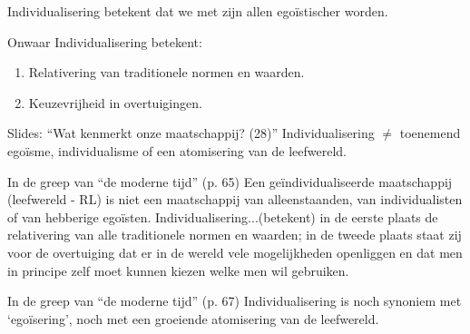 \documentclass[main.tex]{subfiles}
\begin{document}
\begin{examenvraag}
    \begin{stelling}
        Individualisering betekent dat we met zijn allen egoïstischer worden.
    \end{stelling}

    \begin{stelling-antwoord}{Onwaar}
        Individualisering betekent:
        \begin{enumerate}
            \item Relativering van traditionele normen en waarden.
            \item Keuzevrijheid in overtuigingen.
        \end{enumerate}
        \begin{citaat}{Slides: ``Wat kenmerkt onze maatschappij? (28)''}
            Individualisering $\neq$ toenemend ego\"isme, individualisme of een atomisering van de leefwereld.
        \end{citaat}
        \begin{citaat}{In de greep van ``de moderne tijd'' (p. 65)}
            Een ge\"individualiseerde maatschappij (leefwereld - RL) is niet een maatschappij van alleenstaanden, van individualisten of van hebberige ego\"isten.
            Individualisering...(betekent) in de eerste plaats de relativering van alle traditionele normen en waarden; in de tweede plaats staat zij voor de overtuiging dat er in de wereld vele mogelijkheden openliggen en dat men in principe zelf moet kunnen kiezen welke men wil gebruiken.
        \end{citaat}
         \begin{citaat}{In de greep van ``de moderne tijd'' (p. 67)}
            Individualisering is noch synoniem met `ego\"isering', noch met een 
            groeiende atomisering van de leefwereld.
        \end{citaat}
    \end{stelling-antwoord}
\end{examenvraag}
\end{document}
